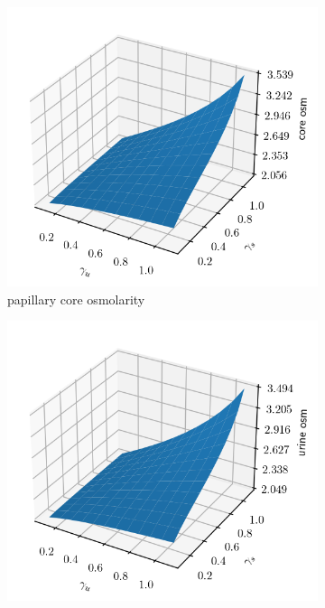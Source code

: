 \documentclass{beamer}
\begin{document}
\begin{frame}
    \begin{figure}
    \centering
    \begin{subfigure}{0.4\textwidth}
        \centering
        \includegraphics[width=\linewidth]{../results/7-20-2023/core_osm.png}
        \caption{papillary core osmolarity}
        \label{fig:core_osm}
    \end{subfigure}%
    \begin{subfigure}{0.4\textwidth}
        \centering
        \includegraphics[width=\linewidth]{../results/7-20-2023/urine_osm.png}

\end{subfigure}
\end{figure}
\end{frame}
\end{document}
